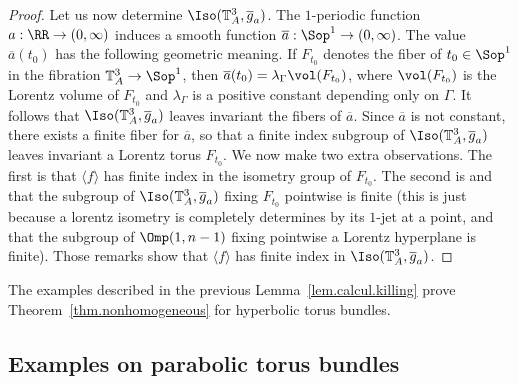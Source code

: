 \begin{proof}
Let us now determine $\Iso({\mathbb T}_A^3,\overline{g}_a)$. The $1$-periodic function $a: \RR \to (0,\infty)$ induces a smooth function $\overline{a}: \Sop^1 \to (0,\infty)$. The value $\overline{a}(t_0)$ has the following geometric meaning. If $F_{t_0}$ denotes the fiber of $t_0 \in \Sop^1$ in the fibration ${\mathbb T}_A^3 \to \Sop^1$, then $\overline{a}(t_0)=\lambda_{\Gamma}\vol(F_{t_0})$, where $\vol(F_{t_0})$ is the Lorentz volume of $F_{t_0}$ and $\lambda_{\Gamma}$ is a positive constant depending only on $\Gamma$. It follows that $\Iso({\mathbb T}_A^3,\overline{g}_a)$ leaves invariant the fibers of $\overline{a}$. Since $\overline{a}$ is not constant, there exists a finite fiber for $\overline{a}$, so that a finite index subgroup of $\Iso({\mathbb T}_A^3,\overline{g}_a)$ leaves invariant a Lorentz torus $F_{t_0}$. We now make two extra observations. The first is that $\langle f \rangle$ has finite index in the isometry group of $F_{t_0}$. The second is and that the subgroup of $\Iso({\mathbb T}_A^3,\overline{g}_a)$ fixing $F_{t_0}$ pointwise is finite (this is just because a lorentz isometry is completely determines by its $1$-jet at a point, and that the subgroup of $\Omp(1,n-1)$ fixing pointwise a Lorentz hyperplane is finite). Those remarks show that $\langle f \rangle$ has finite index in $\Iso({\mathbb T}_A^3,\overline{g}_a)$.
\end{proof}



The examples described in the previous Lemma~\ref{lem.calcul.killing} prove Theorem~\ref{thm.nonhomogeneous} for hyperbolic torus bundles.


\subsection{Examples on parabolic torus bundles}\label{sec.exemplesparaboliques0}

